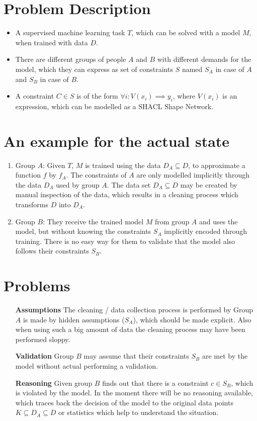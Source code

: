 \documentclass[../../thesis]{subfiles}
\begin{document}
\section{Problem Description}
\begin{itemize}
    \item A supervised machine learning task $T$, which can be solved with a model $M$, when trained with data $D$.
    \item There are different groups of people $A$ and $B$ with different demands for the model, which they can express as set of constraints $S$ named $S_A$ in case of $A$ and $S_B$ in case of $B$. 
    \item A constraint $C \in S$ is of the form $\forall i: V(x_i) \implies y_i$, where $V(x_i)$ is an expression, which can be modelled as a SHACL Shape Network.
\end{itemize}

\section{An example for the actual state}
\begin{enumerate}
    \item Group $A$: Given $T$, $M$ is trained using the data $D_A \subseteq D$, to approximate a function $f$ by $f_A$. The constraints of $A$ are only modelled implicitly through the data $D_A$ used by group $A$. The data set $D_A \subseteq D$ may be created by manual inspection of the data, which results in a cleaning process which transforms $D$ into $D_A$.

    \item Group $B$: They receive the trained model $M$ from group $A$ and uses the model, but without knowing the constraints $S_A$ implicitly encoded through training. There is no easy way for them to validate that the model also follows their constraints $S_B$. 
\end{enumerate}

\section{Problems}
\begin{enumerate}
    \item[\textbf{Assumptions}] The cleaning / data collection process is performed by Group $A$ is made by hidden assumptions ($S_A$), which should be made explicit. Also when using such a big amount of data the cleaning process may have been performed sloppy.
    
    \item[\textbf{Validation}] Group $B$ may assume that their constraints $S_B$ are met by the model without actual performing a validation.
    
    \item[\textbf{Reasoning}] Given group $B$ finds out that there is a constraint $c \in S_B$, which is violated by the model. In the moment there will be no reasoning available, which traces back the decision of the model to the original data points $K \subseteq D_A \subseteq D$ or statistics which help to understand the situation.
\end{enumerate}
\end{document}
